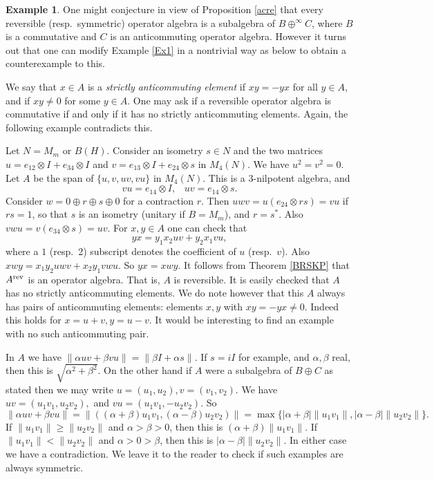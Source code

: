 \documentclass{amsart}
\theoremstyle{remark}
\theoremstyle{definition}
\newtheorem{example}[theorem]{Example}
\numberwithin{equation}{section}
\begin{document}
\begin{example} One might conjecture in view of Proposition \ref{acre} that every reversible (resp.\ symmetric) 
operator algebra is a subalgebra of $B \oplus^\infty C$, where $B$ is a commutative and 
$C$ is an anticommuting operator algebra.   However it turns out that one can modify Example \ref{Ex1} in a nontrivial way as 
below  to obtain  a counterexample to this. 


We say that $x \in A$ is a {\em strictly anticommuting element} if $xy = -yx$ for all $y \in A$, and if $xy \neq 0$ for
some $y \in A$.  One may ask if a reversible operator algebra is commutative if and only if it has no strictly 
anticommuting elements.   Again, the following example contradicts this. 

Let $N = M_m$ or $B(H)$.  Consider an isometry  $s \in N$ and the two  matrices $u = e_{12} \otimes I + e_{34} \otimes I$ and $v = e_{13} \otimes I +  e_{24} \otimes s$ in $M_4(N)$.  
We have $u^2 = v^2 = 0$. 
Let $A$ be the span of $\{ u,v,uv,vu \}$  in $M_{4}(N)$.  This is a 3-nilpotent algebra, and  
$$vu = e_{14} \otimes I , \; \; \;  uv = e_{14} \otimes s .$$ 
Consider $w = 0 \oplus r \oplus s \oplus 0$ for a contraction $r$.  Then $uwv = u (e_{24} \otimes rs) = vu$ if $rs = 1$, so that $s$ is 
an isometry (unitary if $B = M_m$), and $r = s^*$. 
Also $v w u = v (e_{34} \otimes s) = uv$. For $x, y \in A$ one can check that  $$yx = y_1 x_2 uv + y_2 x_1 vu,$$
where a $1$ (resp.\ 2) subscript denotes the coefficient of $u$ (resp.\ $v$).
Also $x w y = x_1 y_2 uwv + x_2 y_1 v w u$. 
So $yx  = x w y$.  It follows from Theorem \ref{BRSKP} that $A^{\rm rev}$ is an operator algebra.  That is, $A$ is reversible.   
It is easily checked that $A$ has no strictly anticommuting elements.  We do note however that this 
$A$ always has pairs of anticommuting elements: elements $x,y$ with $xy=-yx \neq 0$.  Indeed this holds for 
$x = u + v, y = u-v$.    It would be interesting to find an example with no such anticommuting  pair. 

In $A$ we have $\| \alpha uv + \beta vu \| = \| \beta I + \alpha s \|$.    If $s = iI$ for example, and $\alpha, \beta$ real, then this 
is $\sqrt{\alpha^2 + \beta^2}$. 
On the other hand if $A$ were a subalgebra of $B \oplus C$  as stated
then we may write $u = (u_1, u_2), v = (v_1, v_2)$.
We have $uv = (u_1 v_1 , u_2 v_2 ),$ and $vu = (u_1 v_1 , -u_2 v_2 ).$ So
$$\| \alpha uv + \beta vu \| = \| ((\alpha  +\beta)  u_1 v_1 , (\alpha  - \beta)  u_2 v_2) \| = \max \{ |\alpha  +\beta | 
\| u_1 v_1 \| , |\alpha  -\beta |  \| u_2 v_2 \| \}.$$  If $\| u_1 v_1 \| \geq  \| u_2 v_2 \|$
and $\alpha > \beta > 0$, then this is $(\alpha  +\beta)  \| u_1 v_1 \|$.  If  $\| u_1 v_1 \| <  \| u_2 v_2 \|$
and $\alpha > 0 > \beta$, then this is $|\alpha  -\beta |  \| u_2 v_2 \|$.  In either case we have a contradiction.    We leave it to the reader to check if such examples are always symmetric. 
\end{example}
\end{document}

